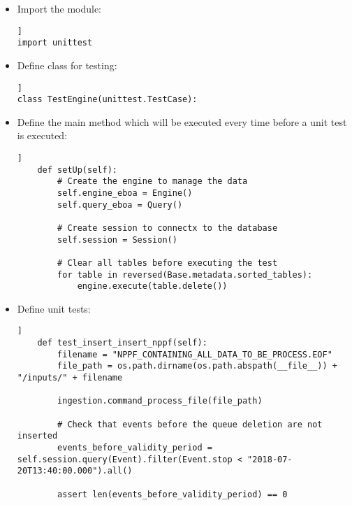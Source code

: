 \begin{itemize}
\item Import the module:
\begin{lstlisting}[breaklines=true, style=python]]
import unittest
\end{lstlisting}
\item Define class for testing:
\begin{lstlisting}[breaklines=true, style=python]]
class TestEngine(unittest.TestCase):
\end{lstlisting}
\item Define the main method which will be executed every time before a unit test is executed:
\begin{lstlisting}[breaklines=true, style=python]]
    def setUp(self):
        # Create the engine to manage the data
        self.engine_eboa = Engine()
        self.query_eboa = Query()

        # Create session to connectx to the database
        self.session = Session()

        # Clear all tables before executing the test
        for table in reversed(Base.metadata.sorted_tables):
            engine.execute(table.delete())
\end{lstlisting}
\item Define unit tests:
\begin{lstlisting}[breaklines=true, style=python]]
    def test_insert_insert_nppf(self):
        filename = "NPPF_CONTAINING_ALL_DATA_TO_BE_PROCESS.EOF"
        file_path = os.path.dirname(os.path.abspath(__file__)) + "/inputs/" + filename

        ingestion.command_process_file(file_path)

        # Check that events before the queue deletion are not inserted
        events_before_validity_period = self.session.query(Event).filter(Event.stop < "2018-07-20T13:40:00.000").all()

        assert len(events_before_validity_period) == 0
\end{lstlisting}
\end{itemize}
